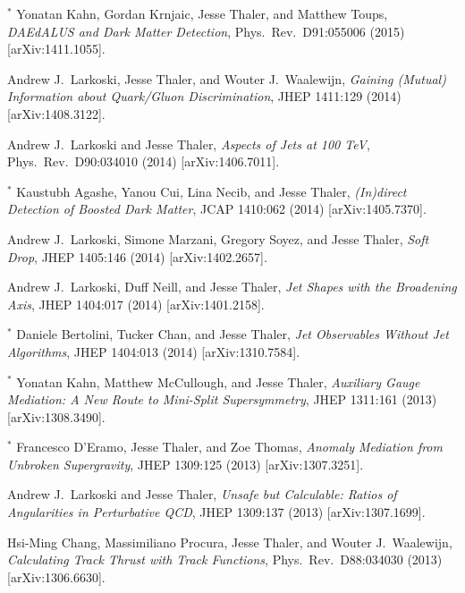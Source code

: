 \begin{list}{[]\addtocounter{jessecount}{-1}}{\leftmargin=3em \itemsep=4pt}
\item
${}^\ast$ Yonatan Kahn, Gordan Krnjaic, Jesse Thaler, and Matthew Toups,
\emph{DAEdALUS and Dark Matter Detection},
Phys.\ Rev.\ D91:055006 (2015)
[arXiv:1411.1055].

\item
 Andrew J.\ Larkoski, Jesse Thaler, and Wouter J.\ Waalewijn,
\emph{Gaining (Mutual) Information about Quark/Gluon Discrimination},
JHEP 1411:129 (2014)
[arXiv:1408.3122].

\item
 Andrew J.\ Larkoski and Jesse Thaler,
\emph{Aspects of Jets at 100 TeV},
Phys.\ Rev.\ D90:034010 (2014)
[arXiv:1406.7011].

\item
${}^\ast$ Kaustubh Agashe, Yanou Cui, Lina Necib, and Jesse Thaler,
\emph{(In)direct Detection of Boosted Dark Matter},
JCAP 1410:062 (2014)
[arXiv:1405.7370].

\item
 Andrew J.\ Larkoski, Simone Marzani, Gregory Soyez, and Jesse Thaler,
\emph{Soft Drop},
JHEP 1405:146 (2014)
[arXiv:1402.2657].

\item
 Andrew J.\ Larkoski, Duff Neill, and Jesse Thaler,
\emph{Jet Shapes with the Broadening Axis},
JHEP 1404:017 (2014)
[arXiv:1401.2158].

\item
${}^\ast$ Daniele Bertolini, Tucker Chan, and Jesse Thaler,
\emph{Jet Observables Without Jet Algorithms},
JHEP 1404:013 (2014)
[arXiv:1310.7584].

\item
${}^\ast$ Yonatan Kahn, Matthew McCullough, and Jesse Thaler,
\emph{Auxiliary Gauge Mediation: A New Route to Mini-Split Supersymmetry},
JHEP 1311:161 (2013)
[arXiv:1308.3490].

\item
${}^\ast$ Francesco D'Eramo, Jesse Thaler, and Zoe Thomas,
\emph{Anomaly Mediation from Unbroken Supergravity},
JHEP 1309:125 (2013)
[arXiv:1307.3251].

\item
 Andrew J.\ Larkoski and Jesse Thaler,
\emph{Unsafe but Calculable: Ratios of Angularities in Perturbative QCD},
JHEP 1309:137 (2013)
[arXiv:1307.1699].

\item
 Hsi-Ming Chang, Massimiliano Procura, Jesse Thaler, and Wouter J.\ Waalewijn,
\emph{Calculating Track Thrust with Track Functions},
Phys.\ Rev.\ D88:034030 (2013)
[arXiv:1306.6630].


\end{list}
